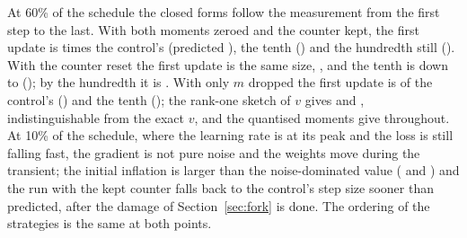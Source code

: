 At 60\% of the schedule the closed forms follow the measurement from the first step to the last. With both moments
zeroed and the counter kept, the first update is \traceZeroOne{} times the control's (predicted \predZeroOne), the
tenth \traceZeroTen{} (\predZeroTen) and the hundredth still \traceZeroHundred{} (\predZeroHundred). With the counter
reset the first update is the same size, \traceFreshOne, and the tenth is down to \traceFreshTen{} (\predFreshTen);
by the hundredth it is \traceFreshHundred. With only $m$ dropped the first update is \traceVOne{} of the control's
(\predVOne) and the tenth \traceVTen{} (\predVTen); the rank-one sketch of $v$ gives \traceRankOne{} and
\traceRankTen, indistinguishable from the exact $v$, and the quantised moments give \traceQOne{} throughout.
At 10\% of the schedule, where the learning rate is at its peak and the loss is still falling fast, the gradient is not
pure noise and the weights move during the transient; the initial inflation is larger than the noise-dominated
value (\traceZeroOneEarly{} and \traceFreshOneEarly) and the run with the kept counter falls back to the control's
step size sooner than predicted, after the damage of Section~\ref{sec:fork} is done. The ordering of the strategies is
the same at both points.
